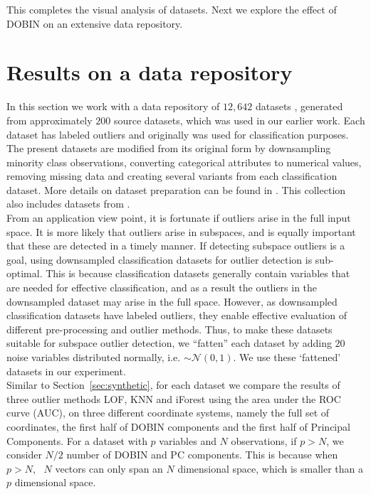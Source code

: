 \documentclass[11pt]{article}
\begin{document}
\noindent
This completes the visual analysis of datasets. Next we  explore the effect of DOBIN on an extensive data repository. 

\section{Results on a data repository}\label{sec:DatRepo}
In this section we work with a data repository of $12,642$ datasets \citep{datasets}, generated from approximately $200$ source datasets, which was used in our earlier work. Each dataset has labeled outliers and  originally was used for classification purposes. The present datasets are modified from its original form by downsampling minority class observations, converting categorical attributes to numerical values, removing missing data and creating several variants from each classification dataset. More details on dataset preparation can be found in \cite{kandanaarachchi2018normalization}. This collection also includes datasets from \cite{campos2016evaluation}. \\

From an application view point, it is fortunate if outliers arise in the full input space. It is more likely that outliers arise in subspaces, and is equally important that these are detected in a timely manner. If detecting subspace outliers is a goal, using downsampled classification datasets for outlier detection is sub-optimal. This is  because classification datasets generally contain variables that are needed for effective classification, and as a result the  outliers in the downsampled dataset may arise in the full space. However, as downsampled classification datasets have labeled outliers, they enable effective evaluation of different pre-processing and outlier methods. Thus, to make these datasets suitable for subspace outlier detection, we ``fatten'' each dataset by adding  $20$ noise variables distributed normally, i.e. $\sim \mathcal{N}(0,1)$.  We use  these `fattened' datasets in our experiment.  \\


Similar to Section~\ref{sec:synthetic}, for each dataset we compare the results of three outlier methods LOF, KNN and iForest using the area under the ROC curve (AUC), on three different coordinate systems, namely the full set of coordinates, the first half of DOBIN components and the first half of Principal Components. For a dataset with $p$ variables and $N$ observations, if $p > N$, we consider $N/2$ number of DOBIN and PC components. This is because when $p >N$, \,  $N$  vectors can only span an $N$ dimensional space, which is smaller than a $p$ dimensional space. \\ %
\end{document}
